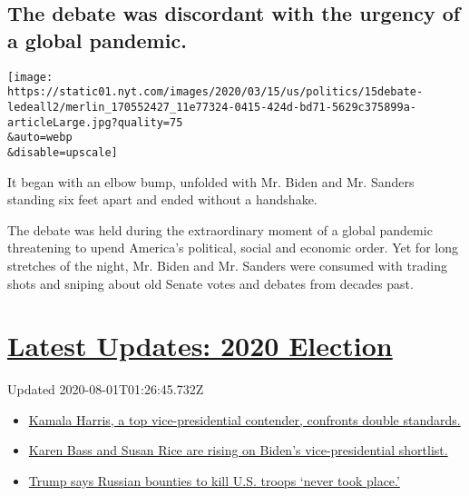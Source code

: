 \hypertarget{the-debate-was-discordant-with-the-urgency-of-a-global-pandemic}{%
\subsection{The debate was discordant with the urgency of a global
pandemic.}\label{the-debate-was-discordant-with-the-urgency-of-a-global-pandemic}}

\texttt{[image: https://static01.nyt.com/images/2020/03/15/us/politics/15debate-ledeall2/merlin\_170552427\_11e77324-0415-424d-bd71-5629c375899a-articleLarge.jpg?quality=75\\\&auto=webp\\\&disable=upscale]}

It began with an elbow bump, unfolded with Mr. Biden and Mr. Sanders
standing six feet apart and ended without a handshake.

The debate was held during the extraordinary moment of a global pandemic
threatening to upend America's political, social and economic order. Yet
for long stretches of the night, Mr. Biden and Mr. Sanders were consumed
with trading shots and sniping about old Senate votes and debates from
decades past.

\hypertarget{latest-updates-2020-election}{%
\section{\texorpdfstring{\href{https://www.nytimes.com/2020/07/31/us/elections/biden-vs-trump.html?action=click\&pgtype=Article\&state=default\&region=MAIN_CONTENT_1\&context=storylines_live_updates}{Latest
Updates: 2020
Election}}{Latest Updates: 2020 Election}}\label{latest-updates-2020-election}}

Updated 2020-08-01T01:26:45.732Z

\begin{itemize}
\tightlist
\item
  \href{https://www.nytimes.com/2020/07/31/us/elections/biden-vs-trump.html?action=click\&pgtype=Article\&state=default\&region=MAIN_CONTENT_1\&context=storylines_live_updates\#link-29fdff45}{Kamala
  Harris, a top vice-presidential contender, confronts double
  standards.}
\item
  \href{https://www.nytimes.com/2020/07/31/us/elections/biden-vs-trump.html?action=click\&pgtype=Article\&state=default\&region=MAIN_CONTENT_1\&context=storylines_live_updates\#link-13ec3d9c}{Karen
  Bass and Susan Rice are rising on Biden's vice-presidential
  shortlist.}
\item
  \href{https://www.nytimes.com/2020/07/31/us/elections/biden-vs-trump.html?action=click\&pgtype=Article\&state=default\&region=MAIN_CONTENT_1\&context=storylines_live_updates\#link-49e9a016}{Trump
  says Russian bounties to kill U.S. troops `never took place.'}
\end{itemize}

